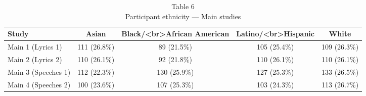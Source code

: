 \begin{table}[t]
\caption*{
{\large Table 6} \\ 
{\small Participant ethnicity — Main studies}
} 
\fontsize{12.0pt}{14.4pt}\selectfont
\begin{tabular*}{\linewidth}{@{\extracolsep{\fill}}lcccc}
\toprule
Study & Asian & Black/<br>African American & Latino/<br>Hispanic & White \\ 
\midrule\addlinespace[2.5pt]
Main 1 (Lyrics 1) & 111 (26.8\%) & 89 (21.5\%) & 105 (25.4\%) & 109 (26.3\%) \\ 
Main 2 (Lyrics 2) & 110 (26.1\%) & 92 (21.8\%) & 110 (26.1\%) & 110 (26.1\%) \\ 
Main 3 (Speeches 1) & 112 (22.3\%) & 130 (25.9\%) & 127 (25.3\%) & 133 (26.5\%) \\ 
Main 4 (Speeches 2) & 100 (23.6\%) & 107 (25.3\%) & 103 (24.3\%) & 113 (26.7\%) \\ 
\bottomrule
\end{tabular*}
\end{table}

